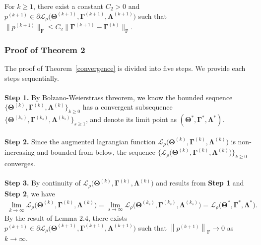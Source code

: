 \documentclass[alpha-refs]{wiley-article}
\begin{document}
\begin{lemma} \label{Lemma2.4}
For $k\geq 1$, there exist a constant $C_{2}>0$ and $p^{(k+1)}\in\partial \mathcal{L}_{\rho} \big( \boldsymbol{\Theta}^{(k+1)},\boldsymbol{\Gamma}^{(k+1)},\boldsymbol{\Lambda}^{(k+1)} \big)$ such that $\|p^{(k+1)}\|_{\text{F}}\leq C_{2} \| \boldsymbol{\Gamma}^{(k+1)} - \boldsymbol{\Gamma}^{(k)} \|_{\text{F}}$.
\end{lemma}

\subsubsection{Proof of Theorem 2} \label{proof_conv}
The proof of Theorem~\ref{convergence} is divided into five steps. 
We provide each steps sequentially.\\ \\
{\textbf{Step 1.}}
By Bolzano-Weierstrass threorem, we know the bounded sequence $\{\boldsymbol{\Theta}^{(k)},\boldsymbol{\Gamma}^{(k)},\boldsymbol{\Lambda}^{(k)}\}_{k \geq 0}$ has a convergent subsequence
$\{\boldsymbol{\Theta}^{(k_{s})},\boldsymbol{\Gamma}^{(k_{s})},\boldsymbol{\Lambda}^{(k_{s})}\}_{s \geq 1}$, and denote its limit point as $(\boldsymbol{\Theta}^{*},\boldsymbol{\Gamma}^{*},\boldsymbol{\Lambda}^{*})$. 
\\ \\
{\textbf{Step 2.}}
Since the augmented lagrangian function $\mathcal{L}_{\rho} \big( \boldsymbol{\Theta}^{(k)},\boldsymbol{\Gamma}^{(k)},\boldsymbol{\Lambda}^{(k)} \big)$ is non-increasing and bounded from below,
the sequence $\{\mathcal{L}_{\rho} \big( \boldsymbol{\Theta}^{(k)},\boldsymbol{\Gamma}^{(k)},\boldsymbol{\Lambda}^{(k)} \big)\}_{k \geq 0}$ converges.
\\ \\
{\textbf{Step 3.}}
By continuity of $\mathcal{L}_{\rho} \big( \boldsymbol{\Theta}^{(k)},\boldsymbol{\Gamma}^{(k)},\boldsymbol{\Lambda}^{(k)} \big)$ and results from \textbf{Step 1} and \textbf{Step 2}, we have
\begin{align*}
    \lim_{k\rightarrow{\infty}} \mathcal{L}_{\rho} \big( \boldsymbol{\Theta}^{(k)},\boldsymbol{\Gamma}^{(k)},\boldsymbol{\Lambda}^{(k)} \big)
    = \lim_{s\rightarrow{\infty}} \mathcal{L}_{\rho} \big( \boldsymbol{\Theta}^{(k_{s})},\boldsymbol{\Gamma}^{(k_{s})},\boldsymbol{\Lambda}^{(k_{s})} \big)
    = \mathcal{L}_{\rho} \big( \boldsymbol{\Theta}^{*},\boldsymbol{\Gamma}^{*},\boldsymbol{\Lambda}^{*} \big).
\end{align*}
By the result of Lemma $2.4$, there exists $p^{(k+1)}\in\partial \mathcal{L}_{\rho} \big( \boldsymbol{\Theta}^{(k+1)},\boldsymbol{\Gamma}^{(k+1)},\boldsymbol{\Lambda}^{(k+1)} \big)$ such that $\left\|p^{(k+1)}\right\|_{\text{F}}\rightarrow{0}$ as $k\rightarrow{\infty}$.
\end{document}
